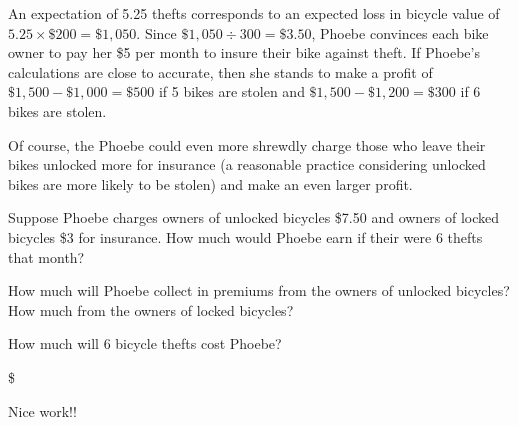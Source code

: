 \documentclass{ximera}
\begin{document}
An expectation of 5.25 thefts corresponds to an expected loss in bicycle value of $5.25\times\$200=\$1,050$. Since $\$1,050\div 300=\$3.50$, Phoebe convinces each bike owner to pay her \$5 per month to insure their bike against theft. If Phoebe's calculations are close to accurate, then she stands to make a profit of $\$1,500-\$1,000=\$500$ if 5 bikes are stolen and $\$1,500-\$1,200=\$300$ if 6 bikes are stolen.

Of course, the Phoebe could even more shrewdly charge those who leave their bikes unlocked more for insurance (a reasonable practice considering unlocked bikes are more likely to be stolen) and make an even larger profit.


\begin{question}
Suppose Phoebe charges owners of unlocked bicycles \$7.50 and owners of locked bicycles \$3 for insurance. How much would Phoebe earn if their were 6 thefts that month?
\begin{solution}
\begin{hint}
How much will Phoebe collect in premiums from the owners of unlocked bicycles? How much from the owners of locked bicycles?
\end{hint}
\begin{hint}
How much will 6 bicycle thefts cost Phoebe?
\end{hint}
\$
\end{solution}
Nice work!!
\end{question}
\end{document}
